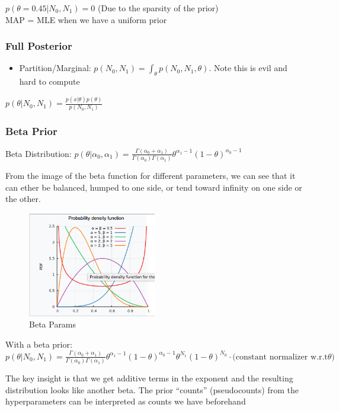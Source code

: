 \documentclass{article}
\begin{document}
$p(\theta=0.45|N_0,N_1) = 0 $ (Due to the sparsity of the prior)\\

MAP = MLE when we have a uniform prior

\subsubsection*{Full Posterior}

\begin{itemize}
\item Partition/Marginal: $p(N_0,N_1) = \int_\theta p(N_0,N_1,\theta)$. Note this is evil and hard to compute
\end{itemize}
$p(\theta|N_0,N_1) = \frac{p(x|\theta) p(\theta)}{p(N_0,N_1)}$

\subsubsection*{Beta Prior}

Beta Distribution: $p(\theta|\alpha_0,\alpha_1) = \frac{\Gamma(\alpha_0 + \alpha_1)}{\Gamma(\alpha_0)\Gamma(\alpha_1)} \theta^{\alpha_1-1} (1-\theta)^{\alpha_0-1}$ 

From the image of the beta function for different parameters, we can see that it can ether be balanced, humped to one side, or tend toward infinity on one side or the other.
\begin{figure}
\centering
\includegraphics[width=0.5\textwidth]{./beta.png}
\caption{Beta Params}
\end{figure}

With a beta prior:  $p(\theta|N_0,N_1) = \frac{\Gamma(\alpha_0 + \alpha_1)}{\Gamma(\alpha_0)\Gamma(\alpha_1)} \theta^{\alpha_1-1} (1-\theta)^{\alpha_0-1} \theta^{N_1}(1-\theta)^{N_0} \cdot \textrm{(constant normalizer w.r.t} \theta) $

The key insight is that we get additive terms in the exponent and the resulting distribution looks like another beta. The prior ``counts'' (pseudocounts) from the hyperparameters can be interpreted as counts we have beforehand
\end{document}
